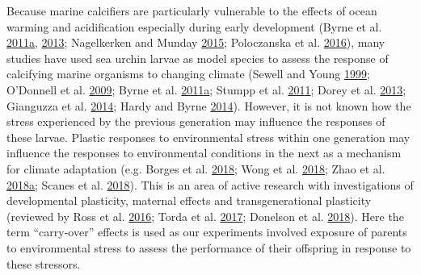 \documentclass[a4paper,10pt, oneside]{memoir}
\begin{document}
Because marine calcifiers are particularly vulnerable to the effects of ocean warming and acidification especially during early development (Byrne et al. \protect\hyperlink{ref-Byrne2011}{2011}\protect\hyperlink{ref-Byrne2011}{a}, \protect\hyperlink{ref-Byrne2013}{2013}; Nagelkerken and Munday \protect\hyperlink{ref-Nagelkerken2015}{2015}; Poloczanska et al. \protect\hyperlink{ref-Poloczanska2016}{2016}), many studies have used sea urchin larvae as model species to assess the response of calcifying marine organisms to changing climate (Sewell and Young \protect\hyperlink{ref-Sewell1999}{1999}; O'Donnell et al. \protect\hyperlink{ref-ODonnell2009}{2009}; Byrne et al. \protect\hyperlink{ref-Byrne2011}{2011}\protect\hyperlink{ref-Byrne2011}{a}; Stumpp et al. \protect\hyperlink{ref-Stumpp2011}{2011}; Dorey et al. \protect\hyperlink{ref-Dorey2013}{2013}; Gianguzza et al. \protect\hyperlink{ref-Gianguzza2014}{2014}; Hardy and Byrne \protect\hyperlink{ref-Hardy2014}{2014}).
However, it is not known how the stress experienced by the previous generation may influence the responses of these larvae.
Plastic responses to environmental stress within one generation may influence the responses to environmental conditions in the next as a mechanism for climate adaptation (e.g. Borges et al. \protect\hyperlink{ref-Borges2018}{2018}; Wong et al. \protect\hyperlink{ref-Wong2018}{2018}; Zhao et al. \protect\hyperlink{ref-Zhao2018}{2018}\protect\hyperlink{ref-Zhao2018}{a}; Scanes et al. \protect\hyperlink{ref-Scanes2018}{2018}). This is an area of active research with investigations of developmental plasticity, maternal effects and transgenerational plasticity (reviewed by Ross et al. \protect\hyperlink{ref-Ross2016}{2016}; Torda et al. \protect\hyperlink{ref-Torda2017}{2017}; Donelson et al. \protect\hyperlink{ref-Donelson2018}{2018}).
Here the term ``carry-over'' effects is used as our experiments involved exposure of parents to environmental stress to assess the performance of their offspring in response to these stressors.
\end{document}
